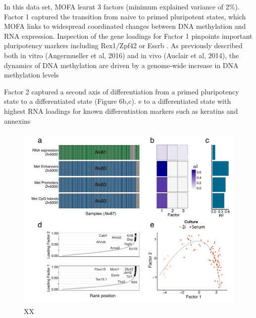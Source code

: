 In this data set, MOFA learnt 3 factors (minimum explained variance of 2\%). Factor 1 captured the transition from naive to primed pluripotent states, which MOFA links to widespread coordinated changes between DNA methylation and RNA expression. Inspection of the gene loadings for Factor 1 pinpoints important pluripotency markers including  Rex1/Zpf42 or Essrb \cite{XX}. As previously described both in vitro (Angermueller et al, 2016) and in vivo (Auclair et al, 2014), the dynamics of DNA methylation are driven by a genome-wide increase in DNA methylation levels \cite{XX}

Factor 2 captured a second axis of differentiation from a primed pluripotency state to a differentiated state (Figure 6b,c).
e to a differentiated state with highest RNA loadings for known differentiation markers such as keratins and annexins




\begin{figure}[H]
	\centering 	
	\includegraphics[width=1.0\textwidth]{MOFA_scMT}
	\caption{XX}
	\label{fig:MOFA_scMT}
\end{figure}

